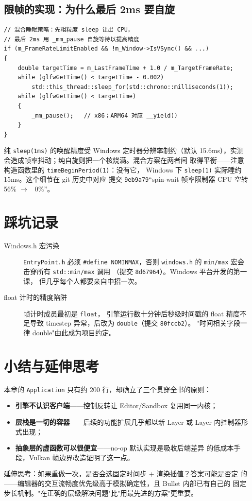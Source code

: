 \subsection{限帧的实现：为什么最后 2ms 要自旋}

\begin{lstlisting}
// 混合睡眠策略：先粗粒度 sleep 让出 CPU，
// 最后 2ms 用 _mm_pause 自旋等待以提高精度
if (m_FrameRateLimitEnabled && !m_Window->IsVSync() && ...)
{
    double targetTime = m_LastFrameTime + 1.0 / m_TargetFrameRate;
    while (glfwGetTime() < targetTime - 0.002)
        std::this_thread::sleep_for(std::chrono::milliseconds(1));
    while (glfwGetTime() < targetTime)
    {
        _mm_pause();   // x86；ARM64 对应 __yield()
    }
}
\end{lstlisting}

纯 \texttt{sleep(1ms)} 的唤醒精度受 Windows 定时器分辨率制约（默认
15.6ms），实测会造成帧率抖动；纯自旋则把一个核烧满。混合方案在两者间
取得平衡——注意构造函数里的 \texttt{timeBeginPeriod(1)}：没有它，
Windows 下 \texttt{sleep(1)} 实际睡约 15ms。这个细节在 git 历史中对应
提交 \texttt{9eb9a79}``spin-wait 帧率限制器 CPU 空转 56\% $\to$ ~0\%''。

\section{踩坑记录}

\begin{description}
  \item[Windows.h 宏污染] \texttt{EntryPoint.h} 必须
        \texttt{\#define NOMINMAX}，否则 \texttt{windows.h} 的
        \texttt{min/max} 宏会击穿所有 \texttt{std::min/max} 调用
        （提交 \texttt{8d67964}）。Windows 平台开发的第一课，
        但几乎每个人都要亲自中招一次。
  \item[float 计时的精度陷阱] 帧计时成员最初是 \texttt{float}，
        引擎运行数十分钟后秒级时间戳的 float 精度不足导致 timestep
        异常，后改为 \texttt{double}（提交 \texttt{80fccb2}）。
        "时间相关字段一律 double"由此成为项目约定。
\end{description}

\section{小结与延伸思考}

本章的 \texttt{Application} 只有约 200 行，却确立了三个贯穿全书的原则：
\begin{itemize}
  \item \textbf{引擎不认识客户端}——控制反转让 Editor/Sandbox 复用同一内核；
  \item \textbf{层栈是一切的容器}——后续的功能扩展几乎都以新 Layer 或
        Layer 内控制器形式出现；
  \item \textbf{抽象层的虚函数可以很便宜}——no-op 默认实现是吸收后端差异
        的低成本手段，Vulkan 帧边界改造证明了这一点。
\end{itemize}

延伸思考：如果重做一次，是否会选固定时间步 + 渲染插值？答案可能是否定
的——编辑器的交互流畅度优先级高于模拟确定性，且 Bullet 内部已有自己的
固定步长机制。"在正确的层级解决问题"比"用最先进的方案"更重要。
